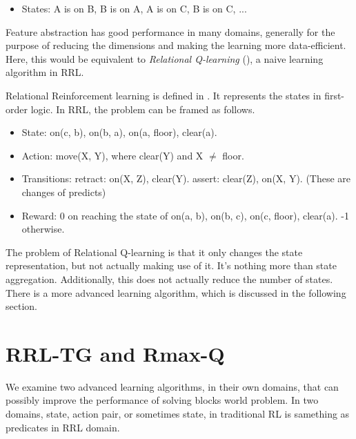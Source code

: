 \documentclass[10pt]{article}
\begin{document}
\begin{itemize}

\item States: {A is on B, B is on A, A is on C, B is on C, ...}

\end{itemize}

Feature abstraction has good performance in many domains, generally for the
purpose of reducing the dimensions and making the learning more data-efficient.
Here, this would be equivalent to \textit{Relational Q-learning}
(\cite{Morales03scalingup}), a naive learning algorithm in RRL.

Relational Reinforcement learning is defined in \cite{Otterlo05asurvey}. It
represents the states in first-order logic. In RRL, the problem can be framed as
follows.

\begin{itemize}

\item State: on(c, b), on(b, a), on(a, floor), clear(a).

\item Action: move(X, Y), where clear(Y) and X $\neq$ floor.

\item Transitions: retract: on(X, Z), clear(Y). assert: clear(Z), on(X, Y).
(These are changes of predicts)

\item Reward: 0 on reaching the state of on(a, b), on(b, c), on(c, floor),
clear(a). -1 otherwise. 

\end{itemize}

The problem of Relational Q-learning is that it only changes the state
representation, but not actually making use of it. It's nothing more than state
aggregation.  Additionally, this does not actually reduce the number of states.
There is a more advanced learning algorithm, which is discussed in the following
section.

\section{RRL-TG and Rmax-Q}

We examine two advanced learning algorithms, in their own domains, that can
possibly improve the performance of solving blocks world problem. In two
domains,  state, action pair, or sometimes state, in traditional RL is samething
as predicates in RRL domain.
\end{document}
